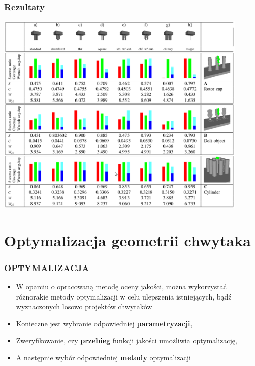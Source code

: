 \documentclass[12pt,a4paper,portrait]{beamer}
\begin{document}
\begin{frame}
\frametitle{Rezultaty}
\begin{center}
\includegraphics[width=0.9\textwidth]{images/oldresults}
\end{center}
\end{frame}


\section{Optymalizacja geometrii chwytaka}
\begin{frame}
\frametitle{OPTYMALIZACJA}
\begin{itemize}
\item W oparciu o opracowaną metodę oceny jakości, można wykorzystać różnorakie metody optymalizacji w celu ulepszenia istniejących, bądź wyznaczonych losowo projektów chwytaków
\item Konieczne jest wybranie odpowiedniej \textbf{parametryzacji},
\item Zweryfikowanie, czy \textbf{przebieg} funkcji jakości umożliwia optymalizację,
\item A następnie wybór odpowiedniej \textbf{metody} optymalizacji
\end{itemize}
\end{frame}
\end{document}
